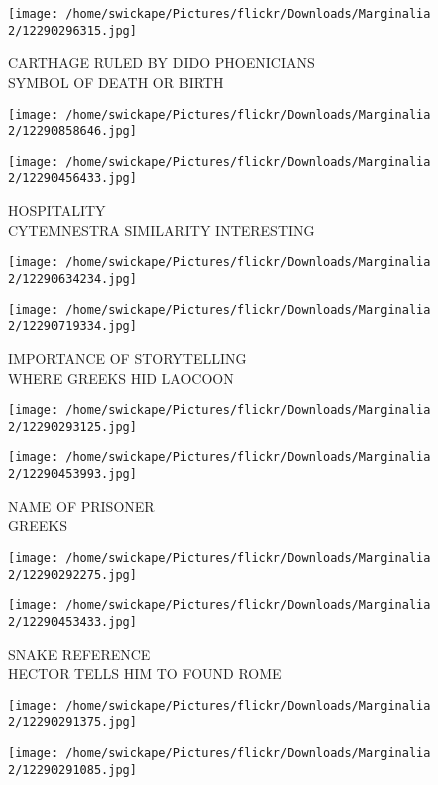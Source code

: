 \documentclass[10pt,letterpaper]{article}
\begin{document}
\vspace{0.25in}
\texttt{[image: /home/swickape/Pictures/flickr/Downloads/Marginalia 2/12290296315.jpg]}

CARTHAGE RULED BY DIDO PHOENICIANS\\
SYMBOL OF DEATH OR BIRTH
\pagebreak

\texttt{[image: /home/swickape/Pictures/flickr/Downloads/Marginalia 2/12290858646.jpg]}

\vspace{0.25in}
\texttt{[image: /home/swickape/Pictures/flickr/Downloads/Marginalia 2/12290456433.jpg]}

HOSPITALITY\\
CYTEMNESTRA SIMILARITY INTERESTING
\pagebreak

\texttt{[image: /home/swickape/Pictures/flickr/Downloads/Marginalia 2/12290634234.jpg]}

\vspace{0.25in}
\texttt{[image: /home/swickape/Pictures/flickr/Downloads/Marginalia 2/12290719334.jpg]}

IMPORTANCE OF STORYTELLING\\
WHERE GREEKS HID LAOCOON
\pagebreak

\texttt{[image: /home/swickape/Pictures/flickr/Downloads/Marginalia 2/12290293125.jpg]}

\vspace{0.25in}
\texttt{[image: /home/swickape/Pictures/flickr/Downloads/Marginalia 2/12290453993.jpg]}

NAME OF PRISONER\\
GREEKS
\pagebreak

\texttt{[image: /home/swickape/Pictures/flickr/Downloads/Marginalia 2/12290292275.jpg]}

\vspace{0.25in}
\texttt{[image: /home/swickape/Pictures/flickr/Downloads/Marginalia 2/12290453433.jpg]}

SNAKE REFERENCE\\
HECTOR TELLS HIM TO FOUND ROME
\pagebreak

\texttt{[image: /home/swickape/Pictures/flickr/Downloads/Marginalia 2/12290291375.jpg]}

\vspace{0.25in}
\texttt{[image: /home/swickape/Pictures/flickr/Downloads/Marginalia 2/12290291085.jpg]}
\end{document}
